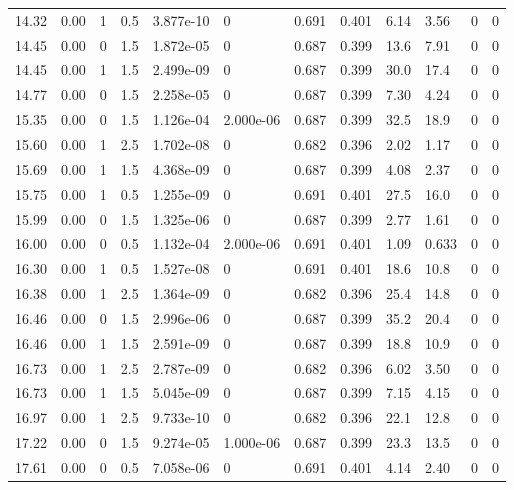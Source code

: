 \documentclass[preview]{standalone}
\begin{document}
{{{\begin{tabular}{L{1.2cm}C{1.2cm} C{0.3cm}C{0.5cm} C{1.4cm}C{1.4cm} C{1.4cm}C{1.4cm} C{1.6cm}C{1.6cm} C{1.6cm}C{1.6cm}}
  14.32  &  0.00  & 1     & 0.5 &  3.877e-10  & 0  &  0.691&   0.401& 6.14 & 3.56   &  0 & 0  \\ 
  14.45  &  0.00  & 0     & 1.5 &  1.872e-05  & 0  &  0.687&   0.399& 13.6 & 7.91   &  0 & 0  \\ 
  14.45  &  0.00  & 1     & 1.5 &  2.499e-09  & 0  &  0.687&   0.399& 30.0 & 17.4   &  0 & 0  \\ 
  14.77  &  0.00  & 0     & 1.5 &  2.258e-05  & 0  &  0.687&   0.399& 7.30 & 4.24   &  0 & 0  \\ 
  15.35  &  0.00  & 0     & 1.5 &  1.126e-04  & 2.000e-06  &  0.687&   0.399& 32.5 & 18.9   &  0 & 0  \\ 
  15.60  &  0.00  & 1     & 2.5 &  1.702e-08  & 0  &  0.682&   0.396& 2.02 & 1.17   &  0 & 0  \\ 
  15.69  &  0.00  & 1     & 1.5 &  4.368e-09  & 0  &  0.687&   0.399& 4.08 & 2.37   &  0 & 0  \\ 
  15.75  &  0.00  & 1     & 0.5 &  1.255e-09  & 0  &  0.691&   0.401& 27.5 & 16.0   &  0 & 0  \\ 
  15.99  &  0.00  & 0     & 1.5 &  1.325e-06  & 0  &  0.687&   0.399& 2.77 & 1.61   &  0 & 0  \\ 
  16.00  &  0.00  & 0     & 0.5 &  1.132e-04  & 2.000e-06  &  0.691&   0.401& 1.09 & 0.633   &  0 & 0  \\ 
  16.30  &  0.00  & 1     & 0.5 &  1.527e-08  & 0  &  0.691&   0.401& 18.6 & 10.8   &  0 & 0  \\ 
  16.38  &  0.00  & 1     & 2.5 &  1.364e-09  & 0  &  0.682&   0.396& 25.4 & 14.8   &  0 & 0  \\ 
  16.46  &  0.00  & 0     & 1.5 &  2.996e-06  & 0  &  0.687&   0.399& 35.2 & 20.4   &  0 & 0  \\ 
  16.46  &  0.00  & 1     & 1.5 &  2.591e-09  & 0  &  0.687&   0.399& 18.8 & 10.9   &  0 & 0  \\ 
  16.73  &  0.00  & 1     & 2.5 &  2.787e-09  & 0  &  0.682&   0.396& 6.02 & 3.50   &  0 & 0  \\ 
  16.73  &  0.00  & 1     & 1.5 &  5.045e-09  & 0  &  0.687&   0.399& 7.15 & 4.15   &  0 & 0  \\ 
  16.97  &  0.00  & 1     & 2.5 &  9.733e-10  & 0  &  0.682&   0.396& 22.1 & 12.8   &  0 & 0  \\ 
  17.22  &  0.00  & 0     & 1.5 &  9.274e-05  & 1.000e-06  &  0.687&   0.399& 23.3 & 13.5   &  0 & 0  \\ 
  17.61  &  0.00  & 0     & 0.5 &  7.058e-06  & 0  &  0.691&   0.401& 4.14 & 2.40   &  0 & 0  \\ 

\end{tabular}}}}
\end{document}
